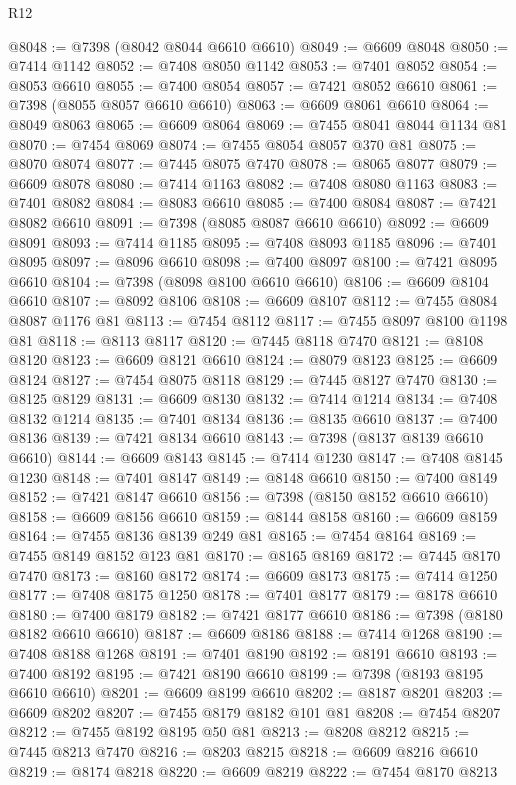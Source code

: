 \begin{lexlean}{R12}
\begin{coremodule}
@8048 := @7398 (@8042 @8044 @6610 @6610)
@8049 := @6609 @8048
@8050 := @7414 @1142
@8052 := @7408 @8050 @1142
@8053 := @7401 @8052
@8054 := @8053 @6610
@8055 := @7400 @8054
@8057 := @7421 @8052 @6610
@8061 := @7398 (@8055 @8057 @6610 @6610)
@8063 := @6609 @8061 @6610
@8064 := @8049 @8063
@8065 := @6609 @8064
@8069 := @7455 @8041 @8044 @1134 @81
@8070 := @7454 @8069
@8074 := @7455 @8054 @8057 @370 @81
@8075 := @8070 @8074
@8077 := @7445 @8075 @7470
@8078 := @8065 @8077
@8079 := @6609 @8078
@8080 := @7414 @1163
@8082 := @7408 @8080 @1163
@8083 := @7401 @8082
@8084 := @8083 @6610
@8085 := @7400 @8084
@8087 := @7421 @8082 @6610
@8091 := @7398 (@8085 @8087 @6610 @6610)
@8092 := @6609 @8091
@8093 := @7414 @1185
@8095 := @7408 @8093 @1185
@8096 := @7401 @8095
@8097 := @8096 @6610
@8098 := @7400 @8097
@8100 := @7421 @8095 @6610
@8104 := @7398 (@8098 @8100 @6610 @6610)
@8106 := @6609 @8104 @6610
@8107 := @8092 @8106
@8108 := @6609 @8107
@8112 := @7455 @8084 @8087 @1176 @81
@8113 := @7454 @8112
@8117 := @7455 @8097 @8100 @1198 @81
@8118 := @8113 @8117
@8120 := @7445 @8118 @7470
@8121 := @8108 @8120
@8123 := @6609 @8121 @6610
@8124 := @8079 @8123
@8125 := @6609 @8124
@8127 := @7454 @8075 @8118
@8129 := @7445 @8127 @7470
@8130 := @8125 @8129
@8131 := @6609 @8130
@8132 := @7414 @1214
@8134 := @7408 @8132 @1214
@8135 := @7401 @8134
@8136 := @8135 @6610
@8137 := @7400 @8136
@8139 := @7421 @8134 @6610
@8143 := @7398 (@8137 @8139 @6610 @6610)
@8144 := @6609 @8143
@8145 := @7414 @1230
@8147 := @7408 @8145 @1230
@8148 := @7401 @8147
@8149 := @8148 @6610
@8150 := @7400 @8149
@8152 := @7421 @8147 @6610
@8156 := @7398 (@8150 @8152 @6610 @6610)
@8158 := @6609 @8156 @6610
@8159 := @8144 @8158
@8160 := @6609 @8159
@8164 := @7455 @8136 @8139 @249 @81
@8165 := @7454 @8164
@8169 := @7455 @8149 @8152 @123 @81
@8170 := @8165 @8169
@8172 := @7445 @8170 @7470
@8173 := @8160 @8172
@8174 := @6609 @8173
@8175 := @7414 @1250
@8177 := @7408 @8175 @1250
@8178 := @7401 @8177
@8179 := @8178 @6610
@8180 := @7400 @8179
@8182 := @7421 @8177 @6610
@8186 := @7398 (@8180 @8182 @6610 @6610)
@8187 := @6609 @8186
@8188 := @7414 @1268
@8190 := @7408 @8188 @1268
@8191 := @7401 @8190
@8192 := @8191 @6610
@8193 := @7400 @8192
@8195 := @7421 @8190 @6610
@8199 := @7398 (@8193 @8195 @6610 @6610)
@8201 := @6609 @8199 @6610
@8202 := @8187 @8201
@8203 := @6609 @8202
@8207 := @7455 @8179 @8182 @101 @81
@8208 := @7454 @8207
@8212 := @7455 @8192 @8195 @50 @81
@8213 := @8208 @8212
@8215 := @7445 @8213 @7470
@8216 := @8203 @8215
@8218 := @6609 @8216 @6610
@8219 := @8174 @8218
@8220 := @6609 @8219
@8222 := @7454 @8170 @8213

\end{coremodule}
\end{lexlean}
